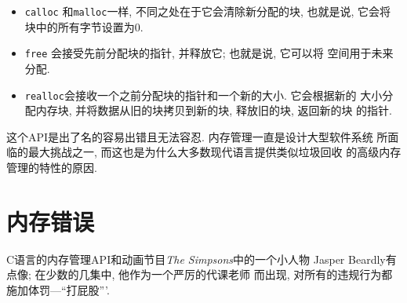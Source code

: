 \documentclass[12pt]{book}
\begin{document}
{\begin{itemize}
\item {\tt calloc} 和{\tt malloc}一样, 不同之处在于它会清除新分配的块,
也就是说, 它会将块中的所有字节设置为0. 

\item {\tt free} 会接受先前分配块的指针, 并释放它; 也就是说, 它可以将
空间用于未来分配. 

\item {\tt realloc}会接收一个之前分配块的指针和一个新的大小. 它会根据新的
大小分配内存块, 并将数据从旧的块拷贝到新的块, 释放旧的块, 返回新的块
的指针.

\end{itemize}

这个API是出了名的容易出错且无法容忍. 内存管理一直是设计大型软件系统
所面临的最大挑战之一, 而这也是为什么大多数现代语言提供类似垃圾回收
的高级内存管理的特性的原因. 


\section{内存错误}

C语言的内存管理API和动画节目{\it The Simpsons}中的一个小人物
Jasper Beardly有点像; 在少数的几集中, 他作为一个严厉的代课老师
而出现, 对所有的违规行为都施加体罚---``打屁股'''. 

}
\end{document}
